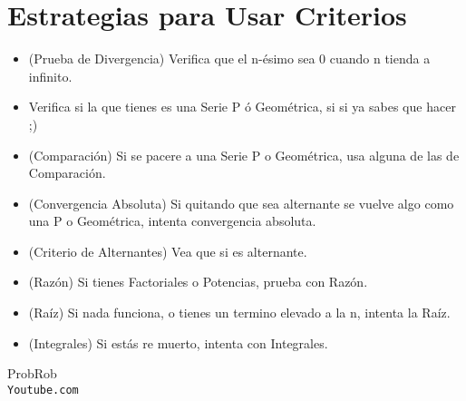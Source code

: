 \documentclass[12pt]{report}                                %
\begin{document}
    \section{Estrategias para Usar Criterios}

    \begin{itemize}
        \item (Prueba de Divergencia) Verifica que el n-ésimo sea 0 cuando n tienda a infinito.
        \item Verifica si la que tienes es una Serie P ó Geométrica, si si ya sabes que hacer ;)
        \item (Comparación) Si se pacere a una Serie P o Geométrica, usa alguna de las de Comparación.
        \item (Convergencia Absoluta) Si quitando que sea alternante se vuelve algo como una P o Geométrica, intenta convergencia absoluta.
        \item (Criterio de Alternantes) Vea que si es alternante.
        \item (Razón) Si tienes Factoriales o Potencias, prueba con Razón.
        \item (Raíz) Si nada funciona, o tienes un termino elevado a la n, intenta la Raíz.
        \item (Integrales) Si estás re muerto, intenta con Integrales.
    \end{itemize}



\clearpage

    \begin{thebibliography}{9}

        ProbRob
        \\\texttt{Youtube.com}


     

\end{thebibliography}
\end{document}
